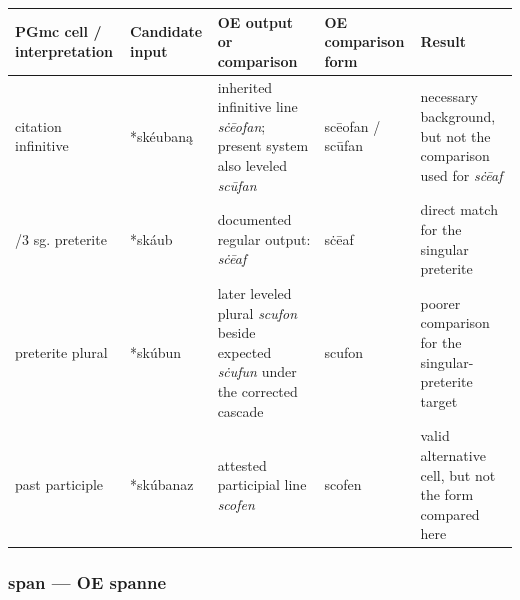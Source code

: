 \documentclass[
  british,
  a4paper,
]{article}
\newcounter{none} %
\begin{document}
{\def\LTcaptype{none} %
\begin{longtable}[]{@{}
  >{\raggedright\arraybackslash}p{}
  >{\raggedright\arraybackslash}p{}
  >{\raggedright\arraybackslash}p{}
  >{\raggedright\arraybackslash}p{}
  >{\raggedright\arraybackslash}p{}@{}}
\toprule\noalign{}
\begin{minipage}[b]{\linewidth}\raggedright
PGmc cell / interpretation
\end{minipage} & \begin{minipage}[b]{\linewidth}\raggedright
Candidate input
\end{minipage} & \begin{minipage}[b]{\linewidth}\raggedright
OE output or comparison
\end{minipage} & \begin{minipage}[b]{\linewidth}\raggedright
OE comparison form
\end{minipage} & \begin{minipage}[b]{\linewidth}\raggedright
Result
\end{minipage} \\
\midrule\noalign{}
\endhead
\bottomrule\noalign{}
\endlastfoot
citation infinitive & *skéubaną & inherited infinitive line
\emph{sċēofan}; present system also leveled \emph{scūfan} & scēofan /
scūfan & necessary background, but not the comparison used for
\emph{sċēaf} \\
1/3 sg. preterite & *skáub & documented regular output: \emph{sċēaf} &
sċēaf & direct match for the singular preterite \\
preterite plural & *skúbun & later leveled plural \emph{scufon} beside
expected \emph{sċufun} under the corrected cascade & scufon & poorer
comparison for the singular-preterite target \\
past participle & *skúbanaz & attested participial line \emph{scofen} &
scofen & valid alternative cell, but not the form compared here \\
\end{longtable}
}

\subsubsection{span --- OE spanne}\label{span-oe-spanne}
\end{document}
